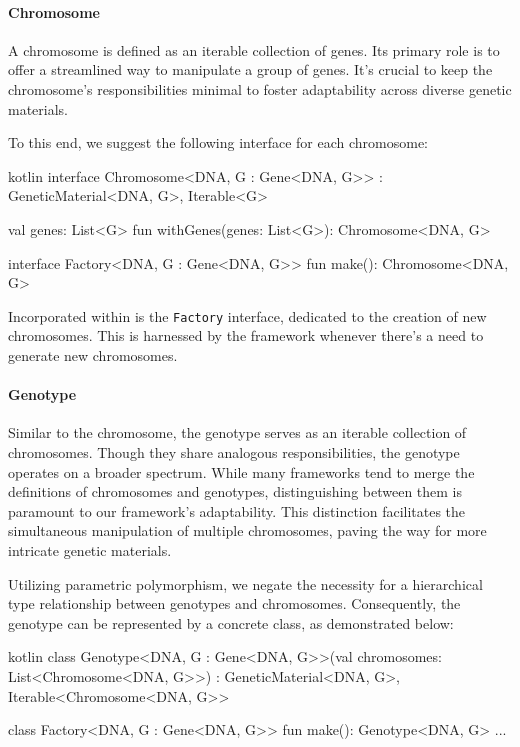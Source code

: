   \paragraph{Chromosome}
    A chromosome is defined as an iterable collection of genes.
    Its primary role is to offer a streamlined way to manipulate a group 
    of genes.
    It's crucial to keep the chromosome's responsibilities minimal to 
    foster adaptability across diverse genetic materials.
    
    To this end, we suggest the following interface for each chromosome:
    
    \begin{code}{kotlin}
      interface Chromosome<DNA, G : Gene<DNA, G>> : GeneticMaterial<DNA, G>, 
                                                    Iterable<G> {
          val genes: List<G>
          fun withGenes(genes: List<G>): Chromosome<DNA, G>
    
          interface Factory<DNA, G : Gene<DNA, G>> {
              fun make(): Chromosome<DNA, G>
          }
      }
    \end{code}
    
    Incorporated within is the \texttt{Factory} interface, dedicated to 
    the creation of new chromosomes.
    This is harnessed by the framework whenever there's a need to generate 
    new chromosomes.

  \paragraph{Genotype}
    Similar to the chromosome, the genotype serves as an iterable collection 
    of chromosomes.
    Though they share analogous responsibilities, the genotype operates on a 
    broader spectrum.
    While many frameworks tend to merge the definitions of chromosomes and 
    genotypes, distinguishing between them is paramount to our framework's 
    adaptability.
    This distinction facilitates the simultaneous manipulation of multiple 
    chromosomes, paving the way for more intricate genetic materials.
    
    Utilizing parametric polymorphism, we negate the necessity for a 
    hierarchical type relationship between genotypes and chromosomes.
    Consequently, the genotype can be represented by a concrete class, as 
    demonstrated below:
    
    \begin{code}{kotlin}
      class Genotype<DNA, G : Gene<DNA, G>>(val chromosomes: List<Chromosome<DNA, G>>) :
          GeneticMaterial<DNA, G>, Iterable<Chromosome<DNA, G>> {
    
          class Factory<DNA, G : Gene<DNA, G>> {
              fun make(): Genotype<DNA, G> { ... }
          }
      }
    \end{code}
    
